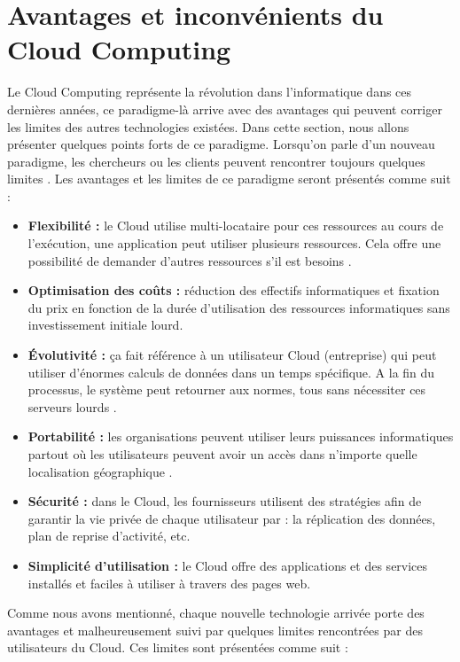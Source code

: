 \section{Avantages et inconvénients du Cloud Computing}
Le Cloud Computing représente la révolution dans l’informatique dans ces dernières années, ce paradigme-là arrive avec des avantages qui peuvent corriger les limites des autres technologies existées. Dans cette section, nous allons présenter quelques points forts de ce paradigme. Lorsqu’on parle d’un nouveau paradigme, les chercheurs ou les clients peuvent rencontrer toujours quelques limites \cite{c87}. Les avantages et les limites de ce paradigme seront présentés comme suit :
\begin{itemize}
    \item \textbf{Flexibilité :} le Cloud utilise multi-locataire pour ces ressources au cours de l’exécution, une application peut utiliser plusieurs ressources. Cela offre une possibilité de demander d’autres ressources s’il est besoins \cite{c87}.
    \item \textbf{Optimisation des coûts :} réduction des effectifs informatiques et fixation du prix en fonction de la durée d’utilisation des ressources informatiques sans investissement initiale lourd.
    \item \textbf{Évolutivité :} ça fait référence à un utilisateur Cloud (entreprise) qui peut utiliser d’énormes calculs de données dans un temps spécifique. A la fin du processus, le système peut retourner aux normes, tous sans nécessiter ces serveurs lourds \cite{c87}.
    \item \textbf{Portabilité :} les organisations peuvent utiliser leurs puissances informatiques partout où les utilisateurs peuvent avoir un accès dans n’importe quelle localisation géographique \cite{c87}.
    \item \textbf{Sécurité :} dans le Cloud, les fournisseurs utilisent des stratégies afin de garantir la vie privée de chaque utilisateur par : la réplication des données, plan de reprise d’activité, etc.
    \item \textbf{Simplicité d’utilisation :} le Cloud offre des applications et des services installés et faciles à utiliser à travers des pages web.
\end{itemize}


Comme nous avons mentionné, chaque nouvelle technologie arrivée porte des avantages et malheureusement suivi par quelques limites rencontrées par des utilisateurs du Cloud. Ces limites sont présentées comme suit :

